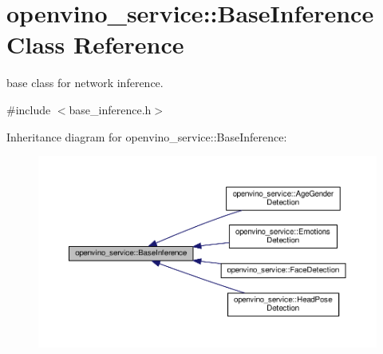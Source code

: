 \hypertarget{classopenvino__service_1_1BaseInference}{}\section{openvino\+\_\+service\+:\+:Base\+Inference Class Reference}
\label{classopenvino__service_1_1BaseInference}


base class for network inference.  




{\ttfamily \#include $<$base\+\_\+inference.\+h$>$}



Inheritance diagram for openvino\+\_\+service\+:\+:Base\+Inference\+:
\nopagebreak
\begin{figure}[H]
\begin{center}
\leavevmode
\includegraphics[width=350pt]{classopenvino__service_1_1BaseInference__inherit__graph}
\end{center}
\end{figure}
